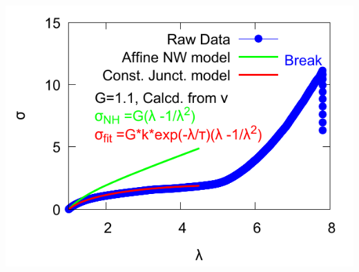 \documentclass[11pt, dvipdfmx]{beamer}
\begin{document}
\begin{frame}
\begin{columns}[totalwidth=1\textwidth]
    \includegraphics[width=\columnwidth]{./fig/SS_MR_6_fit.pdf}
    
    \end{columns}
    \end{frame}
    
\end{document}

